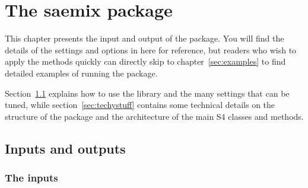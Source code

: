 \chapter{The {\sf saemix} package} \label{sec:package}

This chapter presents the input and output of the \monolix package. You will find the details of the settings and options in here for reference, but readers who wish to apply the methods quickly can directly skip to chapter~\ref{sec:examples} to find detailed examples of running the package.

Section~\ref{sec:usingsaemix} explains how to use the \monolix library and the many settings that can be tuned, while section~\ref{sec:techystuff} contains some technical details on the structure of the package and the architecture of the main S4 classes and methods.

\section{Inputs and outputs} \label{sec:usingsaemix}

\subsection{The inputs}

